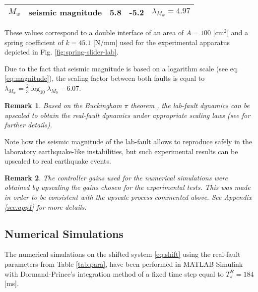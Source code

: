 \documentclass[journal,twoside,web]{ieeecolor}
\newtheorem{remark}{Remark}
\begin{document}
\begin{table*}[ht!]
\begin{center}
\begin{threeparttable}
\begin{tabular}{|c|c|c|c|c|}
$M_w$ & seismic magnitude & 5.8 & -5.2 & $\lambda_{M_w}=4.97$ \\
\hline   
\end{tabular}
\begin{tablenotes}
\item[1] These values correspond to a double interface of an area of $A =100$ [cm$^2$] and a spring coefficient of $k=45.1$ [N/mm] used for the experimental apparatus depicted in Fig. \ref{fig:spring-slider-lab}.\\
\item[2] Due to the fact that seismic magnitude is based on a logarithm scale (see eq. \eqref{eq:magnitude}), the scaling factor between both faults is equal to $\lambda_{M_w}=\frac{2}{3} \log_{10}\lambda_{M_0}-6.07$. 
\end{tablenotes}
\end{threeparttable}
\end{center}
\label{tab:para}
\end{table*}

\begin{remark}
Based on the Buckingham $\pi$ theorem \cite{b:Logan-2013}, the lab-fault dynamics can be upscaled to obtain the real-fault dynamics under appropriate scaling laws (see \cite[Appendix E]{b:Tzortzopoulos-2021} for further details).
\end{remark}

Note how the seismic magnitude of the lab-fault allows to reproduce safely in the laboratory earthquake-like instabilities, but such experimental results can be upscaled to real earthquake events.
 
\begin{remark}
The controller gains used for the numerical simulations were obtained by upscaling the gains chosen for the experimental tests. This was made in order to be consistent with the upscale process commented above. See Appendix \ref{sec:app1} for more details.
\end{remark}

\subsection{Numerical Simulations}

The numerical simulations on the shifted system \eqref{eq:shift} using the real-fault parameters from Table \ref{tab:para}, have been performed in MATLAB Simulink with Dormand-Prince's integration method of a fixed time step equal to $T_s^R=184$ [ms].  
\end{document}
